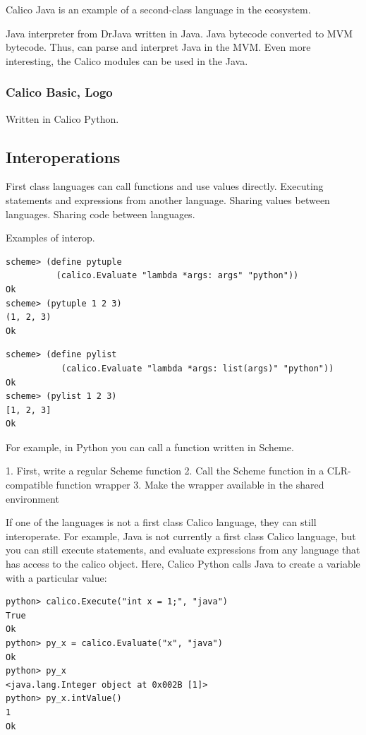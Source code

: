 \documentclass[preprint]{sigplanconf}
\begin{document}
Calico Java is an example of a second-class language in the ecosystem.

Java interpreter from DrJava written in Java. Java bytecode converted
to MVM bytecode. Thus, can parse and interpret Java in the MVM. Even
more interesting, the Calico modules can be used in the Java.

\subsubsection{Calico Basic, Logo}

Written in Calico Python. 

\subsection{Interoperations}

First class languages can call functions and use values
directly. Executing statements and expressions from another language.
Sharing values between languages.  Sharing code between languages.

Examples of interop.

\begin{verbatim}
scheme> (define pytuple 
          (calico.Evaluate "lambda *args: args" "python"))
Ok
scheme> (pytuple 1 2 3)
(1, 2, 3)
Ok
\end{verbatim}



\begin{verbatim}
scheme> (define pylist 
           (calico.Evaluate "lambda *args: list(args)" "python"))
Ok
scheme> (pylist 1 2 3)
[1, 2, 3]
Ok
\end{verbatim}

For example, in Python you can call a function written in Scheme.

1. First, write a regular Scheme function
2. Call the Scheme function in a CLR-compatible function wrapper
3. Make the wrapper available in the shared environment

If one of the languages is not a first class Calico language, they can
still interoperate. For example, Java is not currently a first class
Calico language, but you can still execute statements, and evaluate
expressions from any language that has access to the calico
object. Here, Calico Python calls Java to create a variable with a
particular value:

\begin{verbatim}
python> calico.Execute("int x = 1;", "java")
True
Ok
python> py_x = calico.Evaluate("x", "java")
Ok
python> py_x
<java.lang.Integer object at 0x002B [1]>
python> py_x.intValue()
1
Ok
\end{verbatim}
\end{document}
